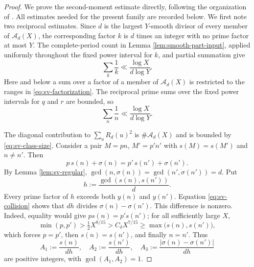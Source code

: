 \documentclass[11pt,letterpaper,reqno]{amsart}
\numberwithin{equation}{section}
\theoremstyle{remark}
\renewcommand{\geq}{\geqslant}
\begin{document}
\begin{proof}
We prove the second-moment estimate directly, following the organization of
\cite[(3.4), \S\S3.1--3.2]{LucaPomerance}. All estimates needed for the
present family are recorded below. We first note two reciprocal estimates. Since $d$ is the largest $Y$-smooth divisor of every
member of $\mathcal{A}_d(X)$, the corresponding factor $k$ is $d$ times an
integer with no prime factor at most $Y$. The complete-period count in
Lemma \ref{lem:smooth-part-input}, applied uniformly throughout the fixed
power interval for $k$, and partial summation give
\begin{equation}\label{eq:sv-k-reciprocal}
 \sum_{k}\frac1k\ll\frac{\log X}{d\log Y}.
\end{equation}
Here and below a sum over a factor of a member of $\mathcal{A}_d(X)$ is
restricted to the ranges in \eqref{eq:sv-factorization}. The reciprocal
prime sums over the fixed power intervals for $q$ and $r$ are bounded, so
\begin{equation}\label{eq:sv-m-reciprocal}
 \sum_n\frac1n\ll\frac{\log X}{d\log Y}.
\end{equation}

The diagonal contribution to $\sum_uR_d(u)^2$ is
$\#\mathcal{A}_d(X)$ and is bounded by \eqref{eq:sv-class-size}. Consider
a pair $M=pn$, $M'=p'n'$ with $s(M)=s(M')$ and $n\ne n'$.
Then
\begin{equation}\label{eq:sv-collision}
 p\,s(n)+\sigma(n)=p'\,s(n')+\sigma(n').
\end{equation}
By Lemma \ref{lem:sv-regular},
$\gcd(n,\sigma(n))=\gcd(n',\sigma(n'))=d$. Put
\[
 h:=\frac{\gcd(s(n),s(n'))}{d}.
\]
Every prime factor of $h$ exceeds both $y(n)$ and $y(n')$. Equation
\eqref{eq:sv-collision} shows that $dh$ divides
$\sigma(n)-\sigma(n')$. This difference is nonzero. Indeed, equality
would give $p s(n)=p's(n')$; for all sufficiently large $X$,
\[
 \min(p,p')>\tfrac12X^{8/15}>C_\delta X^{7/15}
 \geq\max\bigl(s(n),s(n')\bigr),
\]
which forces $p=p'$, then $s(n)=s(n')$, and finally $n=n'$. Thus
\[
 A_1:=\frac{s(n)}{dh},\quad
 A_2:=\frac{s(n')}{dh},\quad
 A_3:=\frac{|\sigma(n)-\sigma(n')|}{dh}
\]
are positive integers, with $\gcd(A_1,A_2)=1$.


\end{proof}
\end{document}
